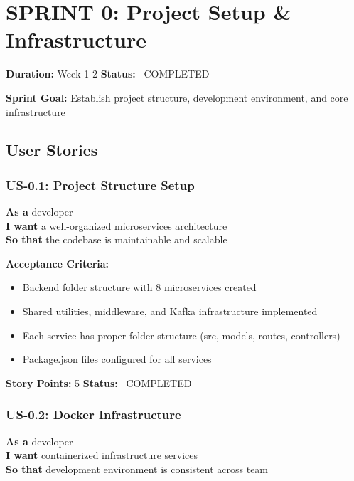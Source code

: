 \documentclass[11pt,a4paper]{article}
\begin{document}
\newpage

\section{SPRINT 0: Project Setup \& Infrastructure}
\textbf{Duration:} Week 1-2 \hfill \textbf{Status:} \textcolor{successgreen}{\faCheckCircle\ COMPLETED}

\textbf{Sprint Goal:} Establish project structure, development environment, and core infrastructure

\subsection{User Stories}

\subsubsection{US-0.1: Project Structure Setup}
\begin{tcolorbox}[colback=white,colframe=primaryblue]
\textbf{As a} developer\\
\textbf{I want} a well-organized microservices architecture\\
\textbf{So that} the codebase is maintainable and scalable
\end{tcolorbox}

\textbf{Acceptance Criteria:}
\begin{itemize}[label=\textcolor{successgreen}{\faCheck}]
    \item Backend folder structure with 8 microservices created
    \item Shared utilities, middleware, and Kafka infrastructure implemented
    \item Each service has proper folder structure (src, models, routes, controllers)
    \item Package.json files configured for all services
\end{itemize}

\textbf{Story Points:} 5 \hfill \textbf{Status:} \textcolor{successgreen}{\faCheckCircle\ COMPLETED}

\vspace{0.5cm}

\subsubsection{US-0.2: Docker Infrastructure}
\begin{tcolorbox}[colback=white,colframe=primaryblue]
\textbf{As a} developer\\
\textbf{I want} containerized infrastructure services\\
\textbf{So that} development environment is consistent across team
\end{tcolorbox}
\end{document}
